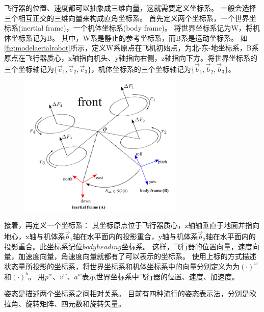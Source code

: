 \documentclass[
  type=master
]{gdutthesis}
\begin{document}
飞行器的位置、速度都可以抽象成三维向量，这就需要定义坐标系。
一般会选择三个相互正交的三维向量来构成直角坐标系。
首先定义两个坐标系，一个世界坐标系(inertial frame)，一个机体坐标系(body frame)。
将世界坐标系记为W，将机体坐标系记为B。
其中，W系是静止的参考坐标系，而B系是运动坐标系。
如\autoref{fig:modelaerialrobot}所示，定义W系原点在飞机初始点，为北-东-地坐标系，B系原点在飞行器质心，x轴指向机头、y轴指向右侧，z轴指向下方。将世界坐标系的三个坐标轴记为$\big\{ \vec{e}_1,\vec{e}_2,\vec{e}_3 \big\}$，机体坐标系的三个坐标轴记为$\big\{ \vec{b}_1,\vec{b}_2,\vec{b}_3 \big\}$。
\begin{figure}[htbp]
	\centering
	\includegraphics[width=0.7\textwidth]{屏幕截图 2022-03-31 222546.png}
	\label{fig:modelaerialrobot}
\end{figure}
接着，再定义一个坐标系：
其坐标原点位于飞行器质心，z轴轴垂直于地面并指向地心，x轴与机体系$\vec{b}_1$轴在水平面内的投影重合，y轴与机体系$\vec{b}_2$轴在水平面内的投影重合。此坐标系记位$bodyheading$坐标系。
这样，飞行器的位置向量，速度向量，加速度向量，角速度向量就都有了可以表示的坐标系。
使用上标的方式描述状态量所投影的坐标系，将世界坐标系和机体坐标系中的向量分别定义为为$(\cdot)^w$和$(\cdot)^b$。
用$p^w$、$v^w$、$a^w$表示世界坐标系中飞行器的位置、速度、加速度。

姿态是描述两个坐标系之间相对关系。
目前有四种流行的姿态表示法，分别是欧拉角、旋转矩阵、四元数和旋转矢量\cite{shuster1993survey}。
\end{document}
